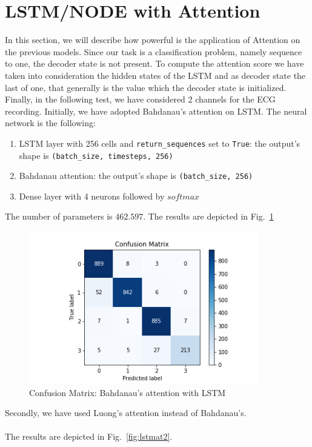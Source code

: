 \documentclass[LaM,binding=0.6cm]{sapthesis}
\begin{document}
\section{LSTM/NODE with Attention}
\label{sec:lstmsection}
In this section, we will describe how powerful is the application of Attention on the previous models. Since our task is a classification problem, namely sequence to one, the decoder state is not present. To compute the attention score we have taken into consideration the hidden states of the LSTM and as decoder state the last of one, that generally is the value which the decoder state is initialized. Finally, in the following test, we have considered 2 channels for the ECG recording. Initially, we have adopted Bahdanau's attention on LSTM. The neural network is the following:
\begin{enumerate}
\item LSTM layer with 256 cells and \texttt{return\_sequences} set to \texttt{True}: the output's shape is \texttt{(batch\_size, timesteps, 256)} 
\item Bahdanau attention: the output's shape is \texttt{(batch\_size, 256)} 
\item Dense layer with 4 neurons followed by $softmax$
\end{enumerate}
The number of parameters is $462.597$.
The results are depicted in Fig.~\ref{fig:lstmat1}
\begin{figure}  \centering
    \includegraphics[width=100mm,scale=0.7]{lstmat1}
    \caption{Confusion Matrix: Bahdanau's attention with LSTM}
    \label{fig:lstmat1}
\end{figure}
Secondly, we have used Luong's attention instead of Bahdanau's.\\\\The results are depicted in Fig.~\ref{fig:lstmat2}.
\end{document}

